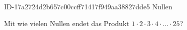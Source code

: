 \begin{exercise}
      {ID-17a2724d2b657c00ccff71417f949aa38827dde5}
      {Nullen}
  \ifproblem\problem\par
    Mit wie vielen Nullen endet das Produkt $1\cdot2\cdot3\cdot4\cdot\ldots\cdot25$?
  \fi
\end{exercise}
